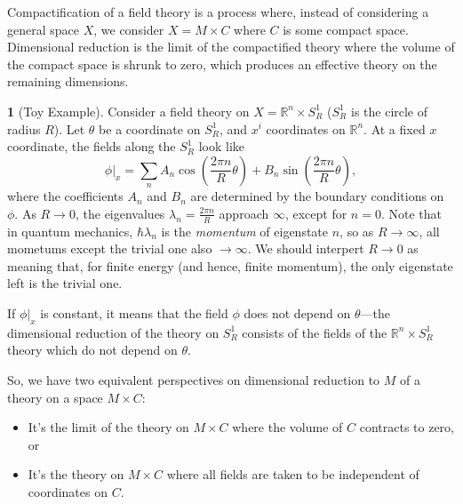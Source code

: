 \documentclass[oneside,english]{amsbook}
\numberwithin{section}{chapter}
\numberwithin{equation}{section}
\numberwithin{figure}{section}
\theoremstyle{plain}
\theoremstyle{definition}
\theoremstyle{remark}
\theoremstyle{definition}
\newtheorem*{example*}{\protect\examplename}
\theoremstyle{definition}
\theoremstyle{plain}
\providecommand{\examplename}{Example}
\begin{document}
Compactification of a field theory is a process where, instead of
considering a general space $X$, we consider $X=M\times C$ where
$C$ is some compact space. Dimensional reduction is the limit of
the compactified theory where the volume of the compact space is shrunk
to zero, which produces an effective theory on the remaining dimensions. 
\begin{example*}
[Toy Example] Consider a field theory on $X=\mathbb{R}^{n}\times S_{R}^{1}$
($S_{R}^{1}$ is the circle of radius $R$). Let $\theta$ be a coordinate
on $S_{R}^{1}$, and $x^{i}$ coordinates on $\mathbb{R}^{n}$. At
a fixed $x$ coordinate, the fields along the $S_{R}^{1}$ look like
\[
\phi|_{x}=\sum_{n}A_{n}\cos\left(\frac{2\pi n}{R}\theta\right)+B_{n}\sin\left(\frac{2\pi n}{R}\theta\right),
\]
where the coefficients $A_{n}$ and $B_{n}$ are determined by the
boundary conditions on $\phi$. As $R\rightarrow0$, the eigenvalues
$\lambda_{n}=\frac{2\pi n}{R}$ approach $\infty$, except for $n=0$.
Note that in quantum mechanics, $\hbar\lambda_{n}$ is the \emph{momentum}
of eigenstate $n$, so as $R\rightarrow\infty$, all mometums except
the trivial one also $\rightarrow\infty$. We should interpert $R\rightarrow0$
as meaning that, for finite energy (and hence, finite momentum), the
only eigenstate left is the trivial one. 

If $\phi|_{x}$ is constant, it means that the field $\phi$ does
not depend on $\theta$---the dimensional reduction of the theory
on $S_{R}^{1}$ consists of the fields of the $\mathbb{R}^{n}\times S_{R}^{1}$
theory which do not depend on $\theta$.
\end{example*}
So, we have two equivalent perspectives on dimensional reduction to
$M$ of a theory on a space $M\times C$:
\begin{itemize}
\item It's the limit of the theory on $M\times C$ where the volume of $C$
contracts to zero, or
\item It's the theory on $M\times C$ where all fields are taken to be independent
of coordinates on $C$.
\end{itemize}
\end{document}
